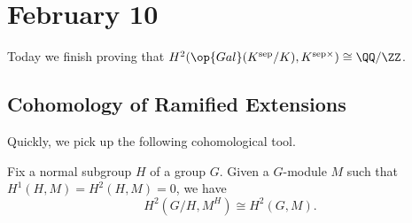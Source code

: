 \documentclass[../notes.tex]{subfiles}
\begin{document}
\section{February 10}

Today we finish proving that $H^2(\op{Gal}(K^{\mathrm{sep}}/K),K^{\mathrm{sep}\times})\cong\QQ/\ZZ$.

\subsection{Cohomology of Ramified Extensions}
Quickly, we pick up the following cohomological tool.
\begin{proposition} \label{prop:res-inf}
	Fix a normal subgroup $H$ of a group $G$. Given a $G$-module $M$ such that $H^1(H,M)=H^2(H,M)=0$, we have
	\[H^2\left(G/H,M^H\right)\cong H^2(G,M).\]
\end{proposition}
\end{document}
